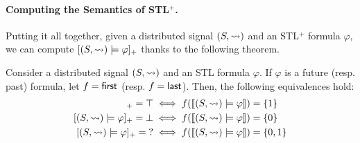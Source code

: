 \paragraph*{Computing the Semantics of STL$^+$.}

Putting it all together, given a distributed signal $(S, {\rightsquigarrow})$ and an STL$^+$ formula $\varphi$, we can compute $[(S,{\rightsquigarrow}) \models \varphi]_+$ thanks to the following theorem.

\bgroup \color{red}
\begin{theorem} \label{cl:algo}
	Consider a distributed signal $(S,{\rightsquigarrow})$ and an STL formula $\varphi$.
	If $\varphi$ is a future (resp. past) formula, let $f = \textsf{first}$ (resp. $f = \textsf{last}$).
	Then, the following equivalences hold:
	\begin{align*}
		[(S,{\hb}) \models \varphi]_+ = \top &\iff f(\llbracket (S, {\hb}) \models \varphi \rrbracket) = \{1\}\\
		[(S,{\hb}) \models \varphi]_+ = \bot &\iff f(\llbracket (S, {\hb}) \models \varphi \rrbracket) = \{0\}\\
		[(S,{\hb}) \models \varphi]_+ = {?} &\iff f(\llbracket (S, {\hb}) \models \varphi \rrbracket) = \{0,1\}
	\end{align*}
\end{theorem}
\egroup

